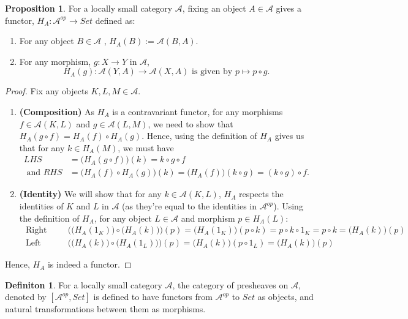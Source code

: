 \documentclass[18pt,a4paper]{article}
\theoremstyle{definition}
\newtheorem{definition}[theorem]{Definiton}
\newtheorem{proop}[theorem]{Proposition}
\begin{document}
\begin{proop} %
	For a locally small category $\mathcal{A}$, fixing an object $A \in \mathcal{A} $ gives
	a functor, $H_A: \mathcal{A} ^{op} \rightarrow Set$ defined as:
	\begin{enumerate}[label=(\roman*)]
		\item For any object $B \in \mathcal{A} $ , $H_A(B):=\mathcal{A} (B,A)$.
		\item For any morphism, $g : X \rightarrow Y $ in $\mathcal{A}$,
			\[H_A(g): \mathcal{A} (Y,A) \rightarrow \mathcal{A}(X,A)
				\text{ is given by } p \mapsto p \circ g.\]
	\end{enumerate}
\end{proop}
\begin{proof}\setcounter{equation}{0}
	Fix any objects $K,L,M \in \mathcal{A} $.
	\begin{enumerate}[label=\Roman*]
		\item \textbf{ (Composition) } As $H_A$ is a contravariant functor, for
			any morphisms $f\in \mathcal{A} (K,L)$ and $g \in
			\mathcal{A}(L,M)$, we need to show that
			$H_A(g \circ f)=H_A(f) \circ H_A(g)$.
			Hence, using the definition of $H_A$ gives us that for any $k \in H_A(M) $, we must have
			\begin{align*}
			LHS&=\Big( H_A(g \circ f) \Big) (k)=k\circ g\circ f \\
		\text{ and } RHS&=\Big( H_A(f)\circ H_A(g) \Big) (k)=\Big( H_A(f) \Big) (k \circ g)
	=(k\circ g)\circ f. \end{align*}
\item \textbf{ (Identity) } We will show that for any $k \in \mathcal{A} (K,L)$, $H_A$ respects the identities
	of $K$ and $L$ in $\mathcal{A}$ (as they're equal to the identities in $\mathcal{A} ^{op}$). Using the definition of $H_A$, for any object $L\in \mathcal{A} $ and
	morphism $p \in H_A(L)$:
	\begin{align*}
		\text{ Right Identity: }& \Big( \big( H_A(1_K) \big) \circ \big( H_A(k) \big) \Big)(p)
		=\big( H_A(1_K) \big) (p \circ k) = p \circ k \circ 1_K=p \circ k = \big( H_A(k) \big)(p)\\
		\text{ Left Identity: }& \Big( \big( H_A(k) \big) \circ \big( H_A(1_L) \big) \Big)(p)
		=\big( H_A(k) \big) (p \circ 1_L) = \big( H_A(k) \big) (p)
	\end{align*}

	\end{enumerate}
	Hence, $H_A$ is indeed a functor.
\end{proof}
\begin{definition} %
	For a locally small category $\mathcal{A} $, the category of presheaves on $\mathcal{A} $, denoted by $[\mathcal{A} ^{op},Set]$
	is defined to have functors from $\mathcal{A} ^{op}$ to $Set$ as objects,
	and natural transformations between them as morphisms.
\end{definition}
\end{document}
